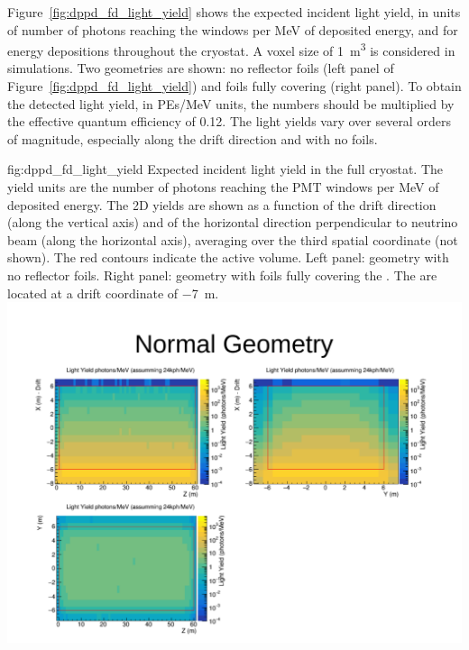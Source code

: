 Figure~\ref{fig:dppd_fd_light_yield} shows the expected incident light yield, in units of number of photons reaching the  windows per MeV of deposited energy, and for energy depositions throughout the   cryostat. A voxel size of \SI{1}{\m^3} is considered in    simulations. Two geometries are shown: no  reflector foils (left panel of Figure~\ref{fig:dppd_fd_light_yield}) and foils fully covering  (right panel). To obtain the detected light yield, in PEs/\si{MeV} units, the numbers should be multiplied by the effective quantum efficiency of 0.12. The light yields vary over several orders of magnitude, especially along the drift direction and with no foils.

\begin{dunefigure}{fig:dppd_fd_light_yield}
{Expected incident light yield in the full   cryostat. The yield units are the number of photons reaching the PMT windows per \si{\MeV} of deposited energy. The 2D yields are shown as a function of the drift direction (along the vertical axis) and of the horizontal direction perpendicular to neutrino beam (along the horizontal axis), averaging over the third spatial coordinate (not shown). The red contours indicate the  active volume. Left panel: geometry with no  reflector foils. Right panel: geometry with foils fully covering the . The  are located at a drift coordinate of \SI{-7}{\m}.}
\includegraphics[trim={14cm 9cm 2cm 4.5cm}, clip, height=0.22\textheight]{graphics/dppd_fd_light_yield_nofoil.pdf} \hfill

\end{dunefigure}
